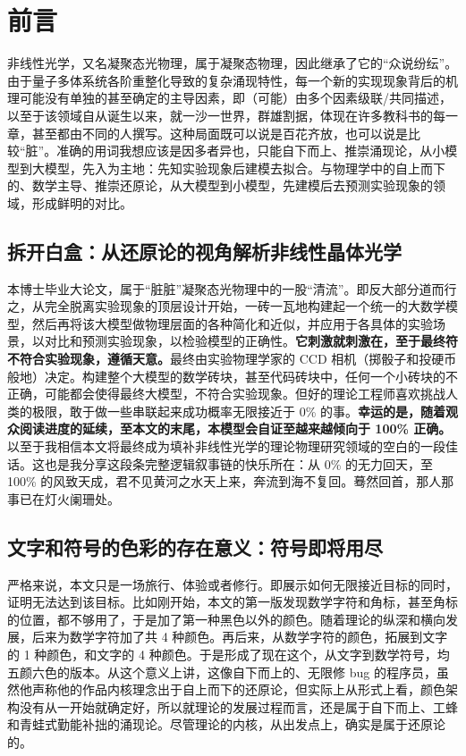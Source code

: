 

\chapter{前言}

非线性光学，又名凝聚态光物理，属于凝聚态物理，因此继承了它的“众说纷纭”。由于量子多体系统各阶重整化导致的复杂涌现特性，每一个新的实现现象背后的机理可能没有单独的甚至确定的主导因素，即（可能）由多个因素级联/共同描述，以至于该领域自从诞生以来，就一沙一世界，群雄割据，体现在许多教科书的每一章，甚至都由不同的人撰写。这种局面既可以说是百花齐放，也可以说是比较“脏”。准确的用词我想应该是因多者异也，只能自下而上、推崇涌现论，从小模型到大模型，先入为主地：先知实验现象后建模去拟合。与物理学中的自上而下的、数学主导、推崇还原论，从大模型到小模型，先建模后去预测实验现象的领域，形成鲜明的对比。

\section{拆开白盒：从还原论的视角解析非线性晶体光学}

本博士毕业大论文，属于“脏脏”凝聚态光物理中的一股“清流”。即反大部分道而行之，从完全脱离实验现象的顶层设计开始，一砖一瓦地构建起一个统一的大数学模型，然后再将该大模型做物理层面的各种简化和近似，并应用于各具体的实验场景，以对比和预测实验现象，以检验模型的正确性。\textbf{它刺激就刺激在，至于最终符不符合实验现象，遵循天意。}最终由实验物理学家的 CCD 相机（掷骰子和投硬币般地）决定。构建整个大模型的数学砖块，甚至代码砖块中，任何一个小砖块的不正确，可能都会使得最终大模型，不符合实验现象。但好的理论工程师喜欢挑战人类的极限，敢于做一些串联起来成功概率无限接近于 0\% 的事。\textbf{幸运的是，随着观众阅读进度的延续，至本文的末尾，本模型会自证至越来越倾向于 100\% 正确。}以至于我相信本文将最终成为填补非线性光学的理论物理研究领域的空白的一段佳话。这也是我分享这段条完整逻辑叙事链的快乐所在：从 0\% 的无力回天，至 100\% 的风致天成，君不见黄河之水天上来，奔流到海不复回。蓦然回首，那人那事已在灯火阑珊处。

\section{文字和符号的色彩的存在意义：符号即将用尽}

严格来说，本文只是一场旅行、体验或者修行。即展示如何无限接近目标的同时，证明无法达到该目标。比如刚开始，本文的第一版发现数学字符和角标，甚至角标的位置，都不够用了，于是加了第一种黑色以外的颜色。随着理论的纵深和横向发展，后来为数学字符加了共 4 种颜色。再后来，从数学字符的颜色，拓展到文字的 1 种颜色，和文字的 4 种颜色。于是形成了现在这个，从文字到数学符号，均五颜六色的版本。从这个意义上讲，这像自下而上的、无限修 bug 的程序员，虽然他声称他的作品内核理念出于自上而下的还原论，但实际上从形式上看，颜色架构没有从一开始就确定好，所以就理论的发展过程而言，还是属于自下而上、工蜂和青蛙式勤能补拙的涌现论。尽管理论的内核，从出发点上，确实是属于还原论的。

